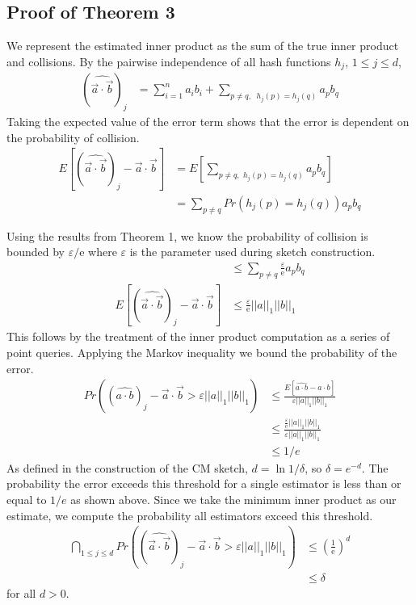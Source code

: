 \documentclass[11pt]{article}
\begin{document}
{	\subsection{Proof of Theorem 3}
		We represent the estimated inner product as the sum of the true inner product and collisions. By the pairwise independence of all hash functions $h_j$, $1 \leq j \leq d$,
		\begin{align}
		(\widehat{\vec a \cdot \vec b})_j &= \sum_{i=1}^n a_ib_i + \sum_{p \neq q, \,\,\ h_j(p)=h_j(q)} a_pb_q
        \end{align}
        Taking the expected value of the error term shows that the error is dependent on the probability of collision.
        \begin{align}
		E\left[(\widehat{\vec a \cdot \vec b})_j - \vec a \cdot \vec b\right] &= E\left[\sum_{p \neq q, \,\, h_j(p)=h_j(q)} a_pb_q\right] \\
		&= \sum_{p \neq q}Pr(h_j(p) = h_j(q))a_pb_q
        \end{align}

        Using the results from Theorem 1, we know the probability of collision is bounded by $\varepsilon/\mathrm e$ where $\varepsilon$ is the parameter used during sketch construction.
        \begin{align}
		&\leq \sum_{p \neq q} \frac{\varepsilon}{\mathrm{e}}a_pb_q \\
		E\left[(\widehat{\vec a \cdot \vec b})_j - \vec a \cdot \vec b\right]&\leq \frac{\varepsilon}{\mathrm e}||a||_1||b||_1
		\end{align}
		This follows by the treatment of the inner product computation as a series of point queries. Applying the Markov inequality we bound the probability of the error.
		\begin{align}
		Pr((\widehat{a \cdot b})_j - \vec a \cdot \vec b > \varepsilon ||a||_1||b||_1) &\leq \frac{E[\widehat{a \cdot b} - a \cdot b]}{\varepsilon||a||_1||b||_1} \\
		&\leq \frac{\frac{\varepsilon}{\mathrm e}||a||_1||b||_1}{\varepsilon||a||_1||b||_1} \\
		& \leq 1/e
        \end{align}
        As defined in the construction of the CM sketch, $d = \ln 1/\delta$, so
        $\delta = e^{-d}$. The probability the error exceeds this threshold for
        a single estimator is less than or equal to $1/e$ as shown above. Since we take the
        minimum inner product as our estimate, we compute the probability all
        estimators exceed this threshold.
        \begin{align}
        \bigcap_{1\leq j \leq d} Pr((\widehat{\vec a \cdot \vec b})_j - \vec a \cdot \vec b > \varepsilon ||a||_1||b||_1) &\leq \left(\frac{1}{\mathrm e}\right)^d \\
        &\leq \delta
        \end{align}
        for all $d > 0$.


}
\end{document}
